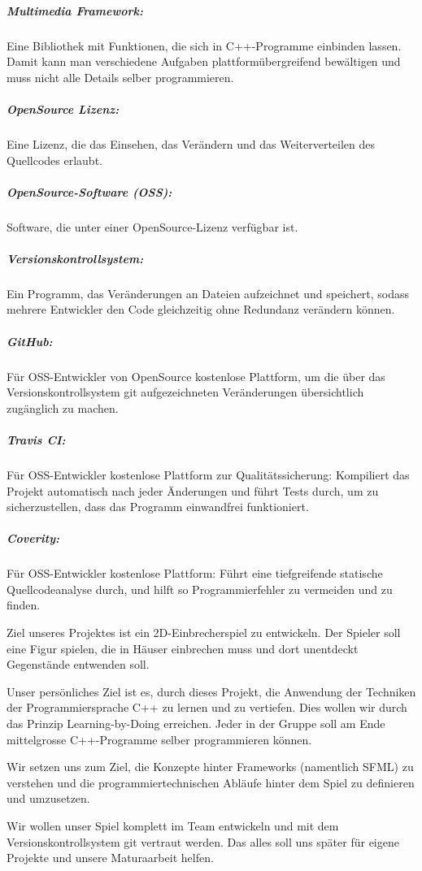 \documentclass[parskip=half]{scrreprt}
\begin{document}
\begin{contract}
\subparagraph{Multimedia Framework:}
Eine Bibliothek mit Funktionen, die sich in C++-Programme einbinden lassen. Damit kann man verschiedene Aufgaben plattformübergreifend bewältigen und muss nicht alle Details selber programmieren.

\subparagraph{OpenSource Lizenz:}

Eine Lizenz, die das Einsehen, das Verändern und das Weiterverteilen des Quellcodes erlaubt.

\subparagraph{OpenSource-Software (OSS):}
Software, die unter einer OpenSource-Lizenz verfügbar ist.

\subparagraph{Versionskontrollsystem:}
Ein Programm, das Veränderungen an Dateien aufzeichnet und speichert, sodass mehrere Entwickler den Code gleichzeitig ohne Redundanz verändern können.

\subparagraph{GitHub:}
Für OSS-Entwickler von OpenSource kostenlose Plattform, um die über das Versionskontrollsystem git aufgezeichneten Veränderungen übersichtlich zugänglich zu machen.

\subparagraph{Travis CI:}
Für OSS-Entwickler kostenlose Plattform zur Qualitätssicherung: Kompiliert das Projekt automatisch nach jeder Änderungen und führt Tests durch, um zu sicherzustellen, dass das Programm einwandfrei funktioniert.

\subparagraph{Coverity:}
Für OSS-Entwickler kostenlose Plattform: Führt eine tiefgreifende statische Quellcodeanalyse durch, und hilft so Programmierfehler zu vermeiden und zu finden.


Ziel unseres Projektes ist ein 2D-Einbrecherspiel zu entwickeln. Der Spieler soll eine Figur spielen, die in Häuser einbrechen muss und dort unentdeckt Gegenstände entwenden soll.

Unser persönliches Ziel ist es, durch dieses Projekt, die Anwendung der Techniken der
Programmiersprache C++ zu lernen und zu vertiefen. Dies wollen wir durch
das Prinzip Learning-by-Doing erreichen. Jeder in der Gruppe soll am Ende
mittelgrosse C++-Programme selber programmieren können.

Wir setzen uns zum Ziel,
die Konzepte hinter Frameworks (namentlich SFML) zu verstehen und die
programmiertechnischen Abläufe hinter dem Spiel zu definieren und
umzusetzen.

Wir wollen unser Spiel komplett im Team entwickeln und
mit dem Versionskontrollsystem git vertraut werden. Das alles soll uns später
für eigene Projekte und unsere Maturaarbeit helfen.


\end{contract}
\end{document}
